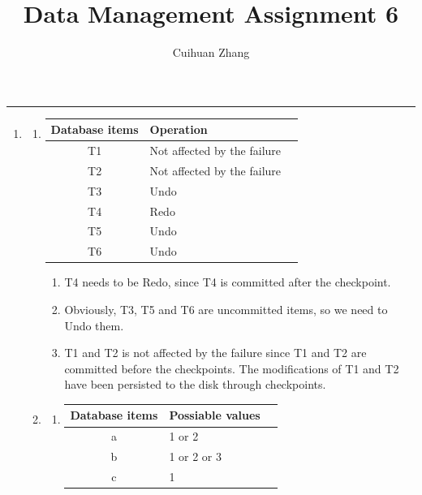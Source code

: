 \documentclass[12pt]{extarticle}
\title{Data Management Assignment 6}
\author{Cuihuan Zhang}
\begin{document}
\maketitle \vspace{-10mm}
\rule{\linewidth}{0.4pt}

\begin{flushleft}
\begin{enumerate}

\item

\begin{enumerate}

\item \begin{tabular}{cll}
\toprule
\textbf{Database items} & \textbf{Operation} \\
\midrule
T1     & Not affected by the failure   \\
T2     & Not affected by the failure    \\
T3     & Undo    \\
T4     & Redo   \\
T5     & Undo   \\
T6     & Undo   \\
\bottomrule
\end{tabular}

\begin{enumerate}

\item T4 needs to be Redo, since T4 is committed after the checkpoint.
\item Obviously, T3, T5 and T6 are uncommitted items, so we need to Undo them.
\item T1 and T2 is not affected by the failure since T1 and T2 are committed before the checkpoints. The modifications of T1 and T2 have been persisted to the disk through checkpoints.
\end{enumerate}

\item

\begin{enumerate}
\item
\begin{tabular}{cll}
\toprule
\textbf{Database items} & \textbf{Possiable values} \\
\midrule
a     & 1 or 2   \\
b     & 1 or 2 or 3    \\
c     & 1    \\
\bottomrule
\end{tabular}


\end{enumerate}
\end{enumerate}
\end{enumerate}
\end{flushleft}
\end{document}
